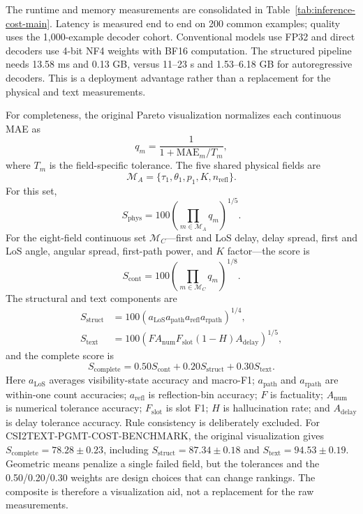The runtime and memory measurements are consolidated in Table~\ref{tab:inference-cost-main}. Latency is
measured end to end on 200 common examples; quality uses the 1,000-example decoder cohort.
Conventional models use FP32 and direct decoders use 4-bit NF4 weights with BF16
computation. The structured pipeline needs 13.58 ms and 0.13 GB, versus 11--23 s and
1.53--6.18 GB for autoregressive decoders. This is a deployment advantage rather than a replacement
for the physical and text measurements.


For completeness, the original Pareto visualization normalizes each continuous MAE as
\begin{equation}
q_m=\frac{1}{1+\mathrm{MAE}_m/T_m},
\end{equation}
where $T_m$ is the field-specific tolerance. The five shared physical fields are
\[
\mathcal M_A=\{\tau_1,\theta_1,p_1,K,n_{\mathrm{refl}}\}.
\]
For this set,
\begin{equation}
S_{\mathrm{phys}}=100\left(\prod_{m\in\mathcal M_A}q_m\right)^{1/5}.
\end{equation}
For the eight-field continuous set $\mathcal M_C$---first and LoS delay, delay spread, first and LoS
angle, angular spread, first-path power, and $K$ factor---the score is
\begin{equation}
S_{\mathrm{cont}}=100\left(\prod_{m\in\mathcal M_C}q_m\right)^{1/8}.
\end{equation}
The structural and text components are
\begin{align}
S_{\mathrm{struct}}&=100\left(a_{\mathrm{LoS}}a_{\mathrm{path}}a_{\mathrm{refl}}
a_{\mathrm{rpath}}\right)^{1/4},\\
S_{\mathrm{text}}&=100\left(F A_{\mathrm{num}}F_{\mathrm{slot}}(1-H)
A_{\mathrm{delay}}\right)^{1/5},
\end{align}
and the complete score is
\begin{equation}
S_{\mathrm{complete}}=0.50S_{\mathrm{cont}}+0.20S_{\mathrm{struct}}+0.30S_{\mathrm{text}}.
\end{equation}
Here $a_{\mathrm{LoS}}$ averages visibility-state accuracy and macro-F1;
$a_{\mathrm{path}}$ and $a_{\mathrm{rpath}}$ are within-one count accuracies;
$a_{\mathrm{refl}}$ is reflection-bin accuracy; $F$ is factuality; $A_{\mathrm{num}}$ is numerical
tolerance accuracy; $F_{\mathrm{slot}}$ is slot F1; $H$ is hallucination rate; and
$A_{\mathrm{delay}}$ is delay tolerance accuracy. Rule consistency is deliberately excluded.
For CSI2TEXT-PGMT-COST-BENCHMARK, the original visualization gives
$S_{\mathrm{complete}}=78.28\pm0.23$, including
$S_{\mathrm{struct}}=87.34\pm0.18$ and $S_{\mathrm{text}}=94.53\pm0.19$.
Geometric means penalize a single failed field, but the tolerances and the 0.50/0.20/0.30 weights are
design choices that can change rankings. The composite is therefore a visualization aid, not a
replacement for the raw measurements.

